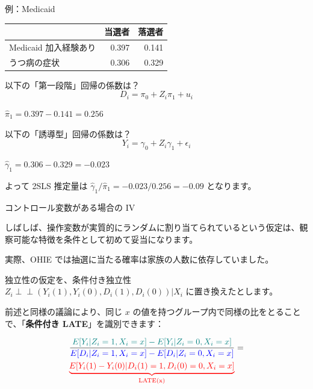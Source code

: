\documentclass[11pt,handout]{beamer}
\newenvironment{wideitemize}{\itemize\addtolength{\itemsep}{10pt}}{\enditemize}
\newcommand{\indep}{\perp\!\!\!\!\perp}
\begin{document}
\begin{frame}{例：Medicaid}
	\begin{tabular}{lrr}
		& 当選者 & 落選者 \\ \hline
		Medicaid 加入経験あり & 0.397 & 0.141 \\
		うつ病の症状 & 0.306 &  0.329 
	\end{tabular}
	
	\bigskip 
	\begin{wideitemize}
		\item
		以下の「第一段階」回帰の係数は？
		$$D_i = \pi_0 + Z_i \pi_1 + u_i$$
		
		\pause
		\item
		$\hat\pi_1 = 0.397 - 0.141 = 0.256$
		
		\pause
		\item
		以下の「誘導型」回帰の係数は？
		$$Y_i = \gamma_0 + Z_i \gamma_1 + \epsilon_i$$
		
		\pause
		\item
		$\hat\gamma_1 = 0.306 - 0.329 = -0.023$
		
		\pause
		\item
		よって 2SLS 推定量は $\hat\gamma_1/\hat\pi_1 = -0.023/0.256 = -0.09$ となります。
	\end{wideitemize}
	
\end{frame}


\begin{frame}{コントロール変数がある場合の IV}
	\begin{wideitemize}
		\item
		しばしば、操作変数が実質的にランダムに割り当てられているという仮定は、観察可能な特徴を条件として初めて妥当になります。
		
		\item
		実際、OHIE では抽選に当たる確率は家族の人数に依存していました。
		
		\pause
		\item
		独立性の仮定を、条件付き独立性 $Z_i \indep (Y_i(1),Y_i(0),D_i(1), D_i(0)) | X_i$ に置き換えたとします。
		
		\item
		前述と同様の議論により、同じ $x$ の値を持つグループ内で同様の比をとることで、「\textbf{条件付き LATE}」を識別できます：
		
		\begin{align*}
			&\dfrac{ \color{teal} E[Y_i | Z_i = 1, X_i = x] - E[Y_i | Z_i = 0, X_i = x ]  }{  \color{blue} E[D_i | Z_i = 1, X_i = x] - E[D_i | Z_i = 0 , X_i = x]   }  = \\&{ \color{red}  \underbrace{ E[Y_i(1) - Y_i(0) | D_i(1) = 1, D_i(0) = 0, X_i = x] }_{\text{LATE(x)}} }
		\end{align*}
		
		
	\end{wideitemize}	
\end{frame}
\end{document}
